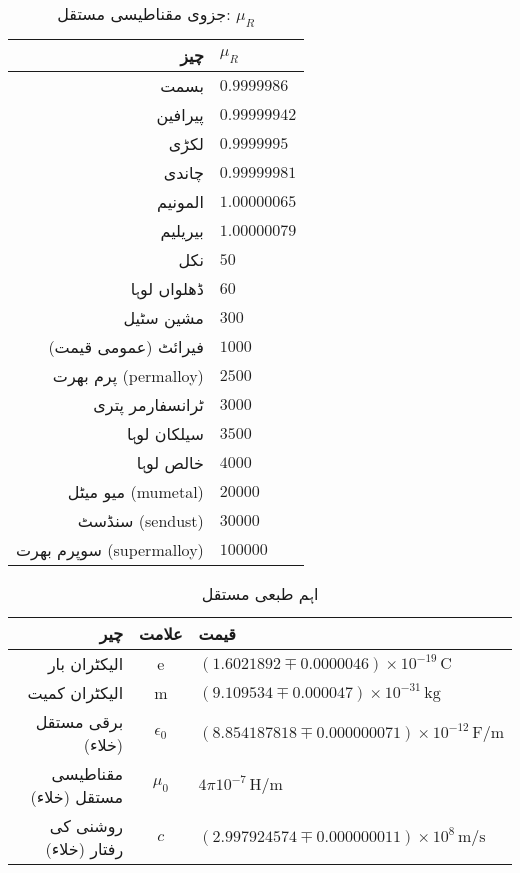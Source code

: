 {\renewcommand{\arraystretch}{1.2}
\begin{table}
\caption*{جزوی مقناطیسی مستقل: $\mu_R$}
\centering
\begin{tabular}{r | l}
\hline
چیز & $\mu_R$ \\
\hline
بسمت & $\num{0.9999986}$\\
پیرافین & $\num{0.99999942}$\\
لکڑی & $\num{0.9999995}$\\
چاندی & $\num{0.99999981}$\\
المونیم & $\num{1.00000065}$\\
بیریلیم & $\num{1.00000079}$\\
نکل & $\num{50}$\\
ڈھلواں لوہا & $\num{60}$\\
مشین سٹیل & $\num{300}$\\
فیرائٹ (عمومی قیمت) & $\num{1000}$\\
پرم بھرت (permalloy) & $\num{2500}$\\
ٹرانسفارمر پتری & $\num{3000}$\\
سیلکان لوہا & $\num{3500}$\\
خالص لوہا & $\num{4000}$\\
میو میٹل (mumetal) & $\num{20000}$\\
سنڈسٹ (sendust) & $\num{30000}$\\
سوپرم بھرت (supermalloy) & $\num{100000}$\\
\end{tabular}
\label{جدول_جدول_جزوی_مقناطیسی_مستقل}
\end{table}
}
{\renewcommand{\arraystretch}{1.2}
\begin{table}
\caption{اہم طبعی مستقل}
\centering
\begin{tabular}{r |c | l}
\hline
چیر & علامت & قیمت\\
\hline
الیکٹران بار & e & $(\num{1.6021892} \mp \num{0.0000046})\times 10^{-19} \, \si{\coulomb}$\\
الیکٹران کمیت & m & $(\num{9.109534} \mp  \num{0.000047}) \times 10^{-31} \, \si{\kilogram}$\\
برقی مستقل (خلاء) & $\epsilon_0$ & $(\num{8.854187818} \mp \num{0.000000071} ) \times 10^{-12} \, \si{\farad \per \meter}$\\
مقناطیسی مستقل (خلاء) & $\mu_0$  &   $4 \pi 10^{-7} \, \si{\henry \per \meter}$\\
روشنی کی رفتار (خلاء) & $c$ & $(\num{2.997924574} \mp \num{0.000000011}) \times 10^{8} \, \si{\meter \per \second}$\\
\end{tabular}
\label{جدول-جدول_اہم_مستقل}
\end{table}
}
